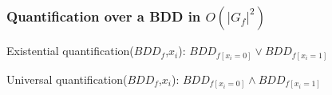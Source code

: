 \documentclass[10pt,a4paper]{beamer}
\begin{document}
\begin{frame}
\begin{minipage}[c]{.55\linewidth}
\end{minipage}


\end{frame}

\begin{frame}[c]
\frametitle{Quantification over a BDD in $O(|G_f|^2)$}

Existential quantification($BDD_f$,$x_i$): $BDD_{f[x_i=0]}\vee BDD_{f[x_i=1]}$

Universal quantification($BDD_f$,$x_i$): $BDD_{f[x_i=0]}\wedge BDD_{f[x_i=1]}$

\end{frame}
\end{document}
